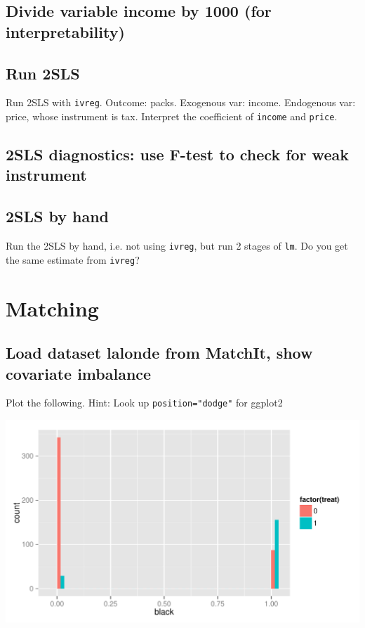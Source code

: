 \documentclass{article}\usepackage[]{graphicx}\usepackage[]{color}
\makeatletter
\def\maxwidth{ %
  \ifdim\Gin@nat@width>\linewidth
    \linewidth
  \else
    \Gin@nat@width
  \fi
}
\newenvironment{knitrout}{}{} %
\makeatother
\begin{document}
\subsection{Divide variable income by 1000 (for interpretability)}

\subsection{Run 2SLS}

Run 2SLS with \verb`ivreg`. Outcome: packs. Exogenous var: income. Endogenous var: price, whose instrument is tax. Interpret the coefficient of \verb`income` and \verb`price`.

\subsection{2SLS diagnostics: use F-test to check for weak instrument}

\subsection{2SLS by hand}

Run the 2SLS by hand, i.e. not using \verb`ivreg`, but run 2 stages of \verb`lm`. Do you get the same estimate from \verb`ivreg`?

\section{Matching}

\subsection{Load dataset lalonde from MatchIt, show covariate imbalance}

Plot the following. Hint: Look up \verb|position="dodge"| for ggplot2

\begin{knitrout}
\color{fgcolor}
\includegraphics[width=\maxwidth]{figure/unnamed-chunk-2-1} 

\end{knitrout}
\end{document}
